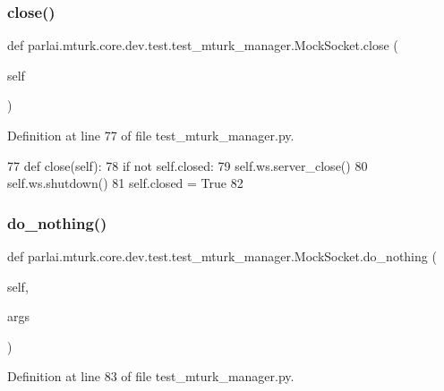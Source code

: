 \subsubsection{\texorpdfstring{close()}{close()}}
{\footnotesize\ttfamily def parlai.\+mturk.\+core.\+dev.\+test.\+test\+\_\+mturk\+\_\+manager.\+Mock\+Socket.\+close (\begin{DoxyParamCaption}\item[{}]{self }\end{DoxyParamCaption})}



Definition at line 77 of file test\+\_\+mturk\+\_\+manager.\+py.


\begin{DoxyCode}
77     \textcolor{keyword}{def }close(self):
78         \textcolor{keywordflow}{if} \textcolor{keywordflow}{not} self.closed:
79             self.ws.server\_close()
80             self.ws.shutdown()
81             self.closed = \textcolor{keyword}{True}
82 
\end{DoxyCode}
\mbox{\label{classparlai_1_1mturk_1_1core_1_1dev_1_1test_1_1test__mturk__manager_1_1MockSocket_ab03ad0630dca832ec066900b06b2cdc9}} 
\subsubsection{\texorpdfstring{do\+\_\+nothing()}{do\_nothing()}}
{\footnotesize\ttfamily def parlai.\+mturk.\+core.\+dev.\+test.\+test\+\_\+mturk\+\_\+manager.\+Mock\+Socket.\+do\+\_\+nothing (\begin{DoxyParamCaption}\item[{}]{self,  }\item[{}]{args }\end{DoxyParamCaption})}



Definition at line 83 of file test\+\_\+mturk\+\_\+manager.\+py.


